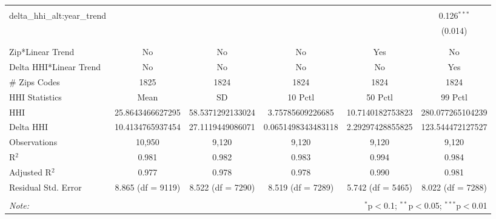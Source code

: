 \begin{table}[H]
{\begin{tabular}{@{\extracolsep{5pt}}lccccc}
   & & & & & \\  

  delta\_hhi\_alt:year\_trend &  &  &  &  & 0.126$^{***}$ \\  

   &  &  &  &  & (0.014) \\  

   & & & & & \\  

 \hline \\[-1.8ex]  

 Zip*Linear Trend & No & No & No & Yes & No \\  

 Delta HHI*Linear Trend & No & No & No & No & Yes \\  

 # Zips Codes & 1825 & 1824 & 1824 & 1824 & 1824 \\  

 HHI Statistics & Mean & SD & 10 Pctl & 50 Pctl & 99 Pctl \\  

 HHI & 25.8643466627295 & 58.5371292133024 & 3.75785609226685 & 10.7140182753823 & 280.077265104239 \\  

 Delta HHI & 10.4134765937454 & 27.1119449086071 & 0.0651498343483118 & 2.29297428855825 & 123.544472127527 \\  

 Observations & 10,950 & 9,120 & 9,120 & 9,120 & 9,120 \\  

 R$^{2}$ & 0.981 & 0.982 & 0.983 & 0.994 & 0.984 \\  

 Adjusted R$^{2}$ & 0.977 & 0.978 & 0.978 & 0.990 & 0.981 \\  

 Residual Std. Error & 8.865 (df = 9119) & 8.522 (df = 7290) & 8.519 (df = 7289) & 5.742 (df = 5465) & 8.022 (df = 7288) \\  

 \hline  

 \hline \\[-1.8ex]  

 \textit{Note:}  & \multicolumn{5}{r}{$^{*}$p$<$0.1; $^{**}$p$<$0.05; $^{***}$p$<$0.01} \\  

 \end{tabular}}  

 \end{table}  


